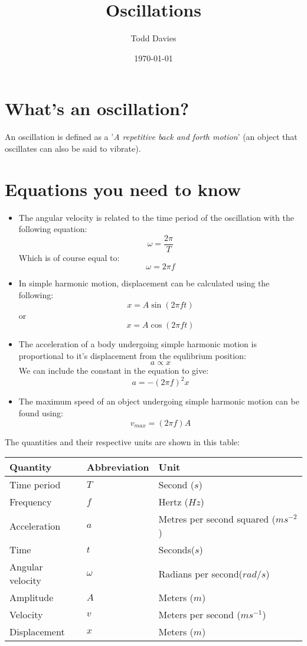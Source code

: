\documentclass{article}
\title{Oscillations}
\author{Todd Davies}
\date{\today}
\begin{document}
\lhead{\today}

\maketitle

\section*{What's an oscillation?}
\thispagestyle{empty}
An oscillation is defined as a '\textit{A repetitive back and forth motion}' (an object that oscillates can also be said to vibrate).

\section*{Equations you need to know}
\begin{itemize}
	\item The angular velocity is related to the time period of the oscillation with the following equation:
	\[
		\omega = \frac{2 \pi}{T}
	\]
	Which is of course equal to:
	\[
	 \omega = 2 \pi f
	\]
	\item In simple harmonic motion, displacement can be calculated using the following:
	\[
		x = A \sin (2 \pi ft)
	\]
	or
	\[
		x = A \cos(2 \pi ft)
	\]
	\item The acceleration of a body undergoing simple harmonic motion is proportional to it's displacement from the equlibrium position:
	\[
		a \propto x
	\]
	We can include the constant in the equation to give:
	\[
		a = -(2 \pi f)^{2}x
	\]
	\item The maximum speed of an object undergoing simple harmonic motion can be found using:
	\[
		v_{max} = (2 \pi f)A
	\]
\end{itemize}

The quantities and their respective units are shown in this table:

\begin{center}
	\begin{tabular}{|l|l|l|}
		\hline
			Quantity & Abbreviation & Unit \\ \hline
			Time period & $T$ & Second ($s$) \\ \hline
			Frequency & $f$ & Hertz ($Hz$) \\ \hline
			Acceleration & $a$ & Metres per second squared ($ms^{-2}$) \\ \hline
			Time & $t$ & Seconds($s$) \\ \hline
			Angular velocity & $\omega$ & Radians per second($rad/s$) \\ \hline
			Amplitude & $A$ & Meters ($m$) \\ \hline
			Velocity & $v$ & Meters per second ($ms^{-1}$) \\ \hline
			Displacement & $x$ & Meters ($m$) \\ \hline
	\end{tabular}
\end{center}
\end{document}
